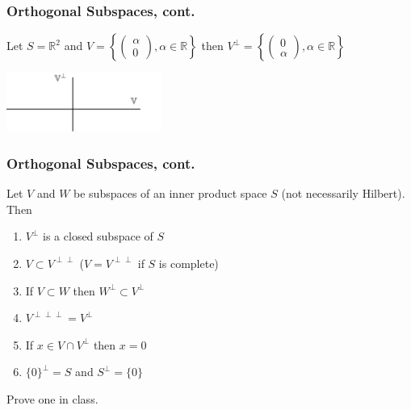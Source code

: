 \documentclass{beamer}
\begin{document}
\begin{frame}\frametitle{Orthogonal Subspaces, cont.}
\begin{example}
Let $S=\mathbb{R}^2$ and $V = \left\{ \left( \begin{array}{c} \alpha\\0\end{array}\right), \alpha \in \mathbb{R} \right\}$ 
then $V^{\perp} = \left\{ \left( \begin{array}{c} 0\\\alpha\end{array}\right), \alpha \in \mathbb{R} \right\}$

\begin{center}
 \includegraphics[width=2in]{figures/chap2_orthogonal_subspaces}		
\end{center}

\end{example}

\end{frame}

\begin{frame}\frametitle{Orthogonal Subspaces, cont.}
	
\begin{theorem}
Let $V$ and $W$ be subspaces of an inner product space $S$ (not necessarily Hilbert).  Then
\begin{enumerate}
  \item $V^{\perp}$ is a closed subspace of $S$
  \item $V \subset V^{\perp \perp}$  ($V = V^{\perp\perp}$ if $S$ is complete)
  \item If $V \subset W$ then $W^{\perp} \subset V^{\perp}$
  \item $V^{\perp\perp\perp} = V^{\perp}$
  \item If $x \in V \cap V^{\perp}$ then $x = 0$
  \item $\{0\}^{\perp} = S$ and $S^{\perp} = \{0\}$
\end{enumerate}
\end{theorem}
Prove one in class.
\end{frame}
\end{document}

